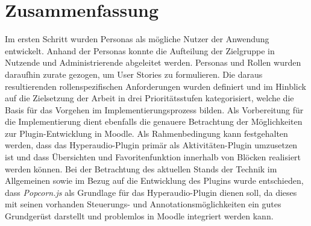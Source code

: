 \section{Zusammenfassung}
Im ersten Schritt wurden Personas als mögliche Nutzer der Anwendung entwickelt. Anhand der Personas konnte die Aufteilung der Zielgruppe in Nutzende und Administrierende abgeleitet werden. Personas und Rollen wurden daraufhin zurate gezogen, um User Stories zu formulieren. Die daraus resultierenden rollenspezifischen Anforderungen wurden definiert und im Hinblick auf die Zielsetzung der Arbeit in drei Prioritätsstufen kategorisiert, welche die Basis für das Vorgehen im Implementierungsprozess bilden. Als Vorbereitung für die Implementierung dient ebenfalls die genauere Betrachtung der Möglichkeiten zur Plugin-Entwicklung in Moodle. Als Rahmenbedingung kann festgehalten werden, dass das Hyperaudio-Plugin primär als Aktivitäten-Plugin umzusetzen ist und dass Übersichten und Favoritenfunktion innerhalb von Blöcken realisiert werden können. Bei der Betrachtung des aktuellen Stands der Technik im Allgemeinen sowie im Bezug auf die Entwicklung des Plugins wurde entschieden, dass \textit{Popcorn.js} als Grundlage für das Hyperaudio-Plugin dienen soll, da dieses mit seinen vorhanden Steuerungs- und Annotationsmöglichkeiten ein gutes Grundgerüst darstellt und problemlos in Moodle integriert werden kann.